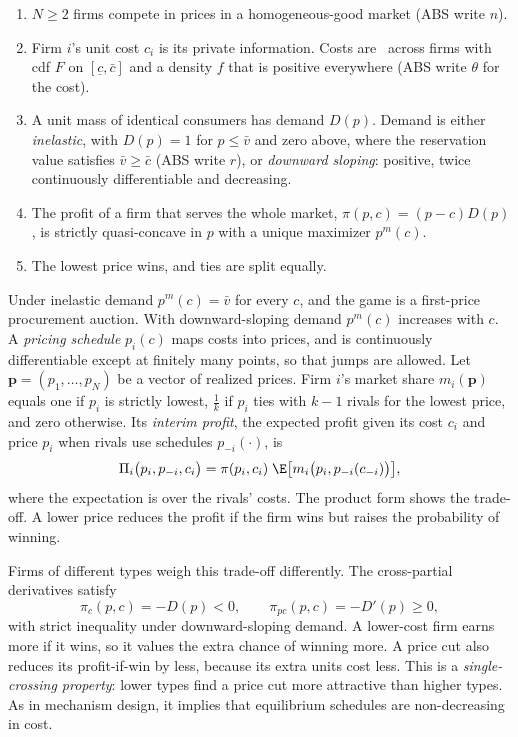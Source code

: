 \begin{assumption}\label{asm:12-abs}
\leavevmode
\begin{enumerate}[label=(\roman*)]
\item $N \ge 2$ firms compete in prices in a homogeneous-good market (ABS write $n$).
\item Firm $i$'s unit cost $c_i$ is its private information. Costs are \iid\ across firms with cdf $F$ on
$[\underline c, \bar c]$ and a density $f$ that is positive everywhere (ABS write $\theta$ for the cost).
\item A unit mass of identical consumers has demand $D(p)$. Demand is either \emph{inelastic}, with $D(p) = 1$ for
$p \le \bar v$ and zero above, where the reservation value satisfies $\bar v \ge \bar c$ (ABS write $r$), or
\emph{downward sloping}: positive, twice continuously differentiable and decreasing.
\item The profit of a firm that serves the whole market, $\pi(p, c) = (p - c)D(p)$, is strictly quasi-concave in $p$
with a unique maximizer $p^m(c)$.
\item The lowest price wins, and ties are split equally.
\end{enumerate}
\end{assumption}

Under inelastic demand $p^m(c) = \bar v$ for every $c$, and the game is a first-price procurement auction. With
downward-sloping demand $p^m(c)$ increases with $c$. A \emph{pricing schedule} $p_i(c)$ maps costs into prices, and
is continuously differentiable except at finitely many points, so that jumps are allowed. Let
$\mathbf{p} = (p_1, \dots, p_N)$ be a vector of realized prices. Firm $i$'s market share $m_i(\mathbf p)$ equals one
if $p_i$ is strictly lowest, $\frac{1}{k}$ if $p_i$ ties with $k - 1$ rivals for the lowest price, and zero otherwise.
Its \emph{interim profit}, the expected profit given its cost $c_i$ and price $p_i$ when rivals use schedules
$p_{-i}(\cdot)$, is
\begin{equation}\label{eq:12-abs-interim}
\Pi_i\bigl(p_i, p_{-i}, c_i\bigr) = \pi(p_i, c_i)\;\E\bigl[m_i\bigl(p_i, p_{-i}(c_{-i})\bigr)\bigr],
\end{equation}
where the expectation is over the rivals' costs. The product form shows the trade-off. A lower price reduces the
profit if the firm wins but raises the probability of winning.

Firms of different types weigh this trade-off differently. The cross-partial derivatives satisfy
\begin{equation}\label{eq:12-abs-sc}
\pi_c(p, c) = -D(p) < 0,
\qquad
\pi_{pc}(p, c) = -D'(p) \ge 0 ,
\end{equation}
with strict inequality under downward-sloping demand. A lower-cost firm earns more if it wins, so it values the
extra chance of winning more. A price cut also reduces its profit-if-win by less, because its extra units cost less.
This is a \emph{single-crossing property}: lower types find a price cut more attractive than higher types. As in
mechanism design, it implies that equilibrium schedules are non-decreasing in cost.

